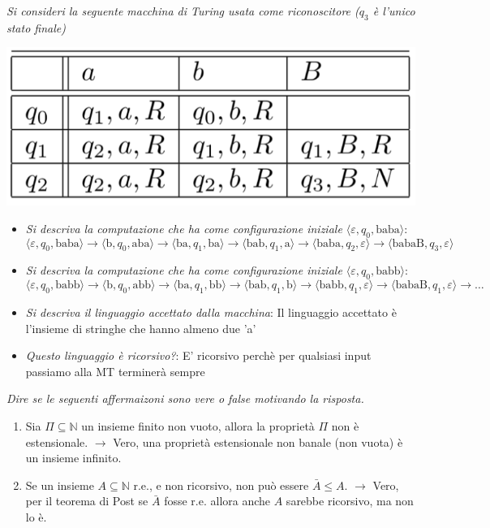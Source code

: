 \documentclass[12pt, a4paper]{report}
\begin{document}
        \begin{exercise}
            \textit{Si consideri la seguente macchina di Turing usata come riconoscitore ($q_3$ è l'unico stato finale)}
            \begin{center}
                \includegraphics[width=.5\textwidth]{Images/tmluglio2022.png}
            \end{center}
            \begin{itemize}
                \item \textit{Si descriva la computazione che ha come configurazione iniziale $\langle \varepsilon,q_0,\text{baba}\rangle$}: $$
                \langle \varepsilon,q_0,\text{baba}\rangle\to \langle \text{b},q_0,\text{aba}\rangle\to \langle \text{ba},q_1,\text{ba}\rangle\to \langle \text{bab},q_1,\text{a}\rangle\to \langle \text{baba},q_2,\varepsilon\rangle\to \langle \text{babaB},q_3,\varepsilon\rangle
                $$
                \item \textit{Si descriva la computazione che ha come configurazione iniziale $\langle \varepsilon,q_0,\text{babb}\rangle$}: $$
                \langle \varepsilon,q_0,\text{babb}\rangle\to \langle \text{b},q_0,\text{abb}\rangle\to \langle \text{ba},q_1,\text{bb}\rangle\to \langle \text{bab},q_1,\text{b}\rangle\to \langle \text{babb},q_1,\varepsilon\rangle\to \langle \text{babaB},q_1,\varepsilon\rangle\to\ldots
                $$
                \item \textit{Si descriva il linguaggio accettato dalla macchina}: Il linguaggio accettato è l'insieme di stringhe che hanno almeno due 'a'
                \item \textit{Questo linguaggio è ricorsivo?}: E' ricorsivo perchè per qualsiasi input passiamo alla MT terminerà sempre
            \end{itemize}
        \end{exercise}
        \begin{exercise}
            \textit{Dire se le seguenti affermaizoni sono vere o false motivando la risposta.}
            \begin{enumerate}
                \item Sia $\Pi\subseteq\mathbb{N}$ un insieme finito non vuoto, allora la proprietà $\Pi$ non è estensionale. $\rightarrow$ Vero, una proprietà estensionale non banale (non vuota) è un insieme infinito.
                \item Se un insieme $A\subseteq\mathbb{N}$ r.e., e non ricorsivo, non può essere $\bar{A}\leq A$. $\rightarrow$ Vero, per il teorema di Post se $\bar{A}$ fosse r.e. allora anche $A$ sarebbe ricorsivo, ma non lo è.
            \end{enumerate}
        \end{exercise}
\end{document}
